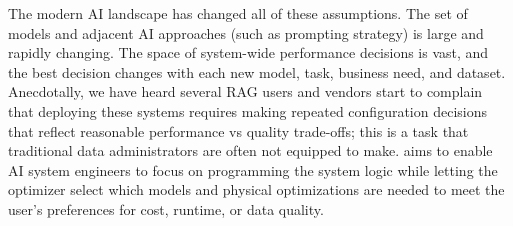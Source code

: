 The modern AI landscape has changed all of these assumptions. The set of models and adjacent AI approaches (such as prompting strategy) is large and rapidly changing. The space of system-wide performance decisions is vast, and the best decision changes with each new model, task, business need, and dataset. Anecdotally, we have heard several RAG users and vendors start to complain that deploying these systems requires making repeated configuration decisions that reflect reasonable performance vs quality trade-offs; this is a task that traditional data administrators are often not equipped to make. \system{} aims to enable AI system engineers to focus on programming the system logic while letting the optimizer select which models and physical optimizations are needed to meet the user's preferences for cost, runtime, or data quality.




